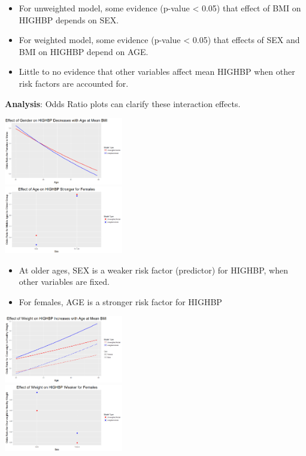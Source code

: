 \documentclass[paperwidth=58in,paperheight=47in,portrait]{baposter}
\begin{document}
\begin{poster}
{\begin{itemize}
\item For unweighted model, some evidence (p-value < 0.05) that effect of BMI on HIGHBP depends on SEX.
\item For weighted model, some evidence (p-value < 0.05) that effects of SEX and BMI on HIGHBP depend on AGE.
\item Little to no evidence that other variables affect mean HIGHBP when other risk factors are accounted for.
\end{itemize}
}


 {
\textbf{Analysis}: Odds Ratio plots can clarify these interaction effects.

\begin{multicols}{2}
\includegraphics[width=14em]{SexOdds_Age.png} \\
\includegraphics[width=14em]{AgeOdds_Sex.png} 
\end{multicols}

\begin{itemize}
\item At older ages, SEX is a weaker risk factor (predictor) for HIGHBP, when other variables are fixed.
\item For females, AGE is a stronger risk factor for HIGHBP
\end{itemize}

\begin{multicols}{2}
\includegraphics[width=14em]{WeightOdds_Age.png} \\
\includegraphics[width=14em]{WeightOdds_Sex.png} 
\end{multicols}

}
\end{poster}
\end{document}
